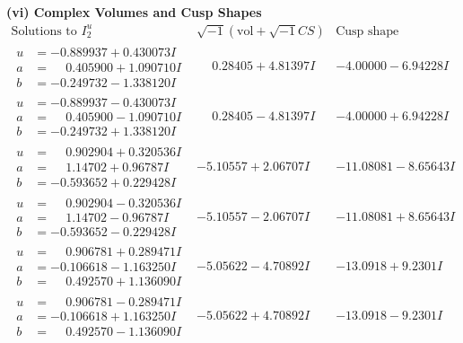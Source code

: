 \documentclass[1p]{elsarticle_modified}
\theoremstyle{definition}
\newcommand{\I}{\sqrt{-1}}
\begin{document}
\newpage\flushleft \textbf{(vi) Complex Volumes and Cusp Shapes}
$$\begin{array}{c|c|c}  
\text{Solutions to }I^u_{2}& \I (\text{vol} + \sqrt{-1}CS) & \text{Cusp shape}\\
 \hline 
\begin{aligned}
u &= -0.889937 + 0.430073 I \\
a &= \phantom{-}0.405900 + 1.090710 I \\
b &= -0.249732 - 1.338120 I\end{aligned}
 & \phantom{-}0.28405 + 4.81397 I & -4.00000 - 6.94228 I \\ \hline\begin{aligned}
u &= -0.889937 - 0.430073 I \\
a &= \phantom{-}0.405900 - 1.090710 I \\
b &= -0.249732 + 1.338120 I\end{aligned}
 & \phantom{-}0.28405 - 4.81397 I & -4.00000 + 6.94228 I \\ \hline\begin{aligned}
u &= \phantom{-}0.902904 + 0.320536 I \\
a &= \phantom{-}1.14702 + 0.96787 I \\
b &= -0.593652 + 0.229428 I\end{aligned}
 & -5.10557 + 2.06707 I & -11.08081 - 8.65643 I \\ \hline\begin{aligned}
u &= \phantom{-}0.902904 - 0.320536 I \\
a &= \phantom{-}1.14702 - 0.96787 I \\
b &= -0.593652 - 0.229428 I\end{aligned}
 & -5.10557 - 2.06707 I & -11.08081 + 8.65643 I \\ \hline\begin{aligned}
u &= \phantom{-}0.906781 + 0.289471 I \\
a &= -0.106618 - 1.163250 I \\
b &= \phantom{-}0.492570 + 1.136090 I\end{aligned}
 & -5.05622 - 4.70892 I & -13.0918 + 9.2301 I \\ \hline\begin{aligned}
u &= \phantom{-}0.906781 - 0.289471 I \\
a &= -0.106618 + 1.163250 I \\
b &= \phantom{-}0.492570 - 1.136090 I\end{aligned}
 & -5.05622 + 4.70892 I & -13.0918 - 9.2301 I \\ \hline\begin{aligned}

\end{aligned}
\end{array}$$
\end{document}

